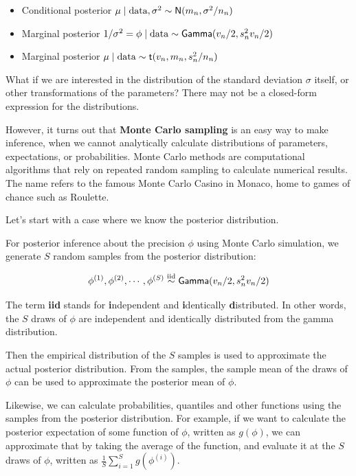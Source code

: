 \documentclass[]{book}
\providecommand{\tightlist}{%
  \setlength{\itemsep}{0pt}\setlength{\parskip}{0pt}}
\theoremstyle{definition}
\theoremstyle{definition}
\theoremstyle{definition}
\theoremstyle{remark}
\begin{document}
\begin{itemize}
\tightlist
\item
  Conditional posterior
  \(\mu \mid \text{data}, \sigma^2 \sim \textsf{N}(m_n, \sigma^2/n_n)\)
\item
  Marginal posterior
  \(1/\sigma^2 = \phi \mid \text{data} \sim \textsf{Gamma}(v_n/2,s^2_n v_n/2)\)
\item
  Marginal posterior \(\mu \mid \text{data} \sim \textsf{t}(v_n, m_n, s^2_n/n_n)\)
\end{itemize}

What if we are interested in the distribution of the standard deviation
\(\sigma\) itself, or other transformations of the parameters? There may
not be a closed-form expression for the distributions.

However, it turns out that \textbf{Monte Carlo sampling} is an easy way
to make inference, when we cannot analytically calculate distributions
of parameters, expectations, or probabilities. Monte Carlo methods are
computational algorithms that rely on repeated random sampling to
calculate numerical results. The name refers to the famous Monte Carlo
Casino in Monaco, home to games of chance such as Roulette.

Let's start with a case where we know the posterior distribution.

For posterior inference about the precision \(\phi\) using Monte Carlo
simulation, we generate \(S\) random samples from the posterior
distribution:

\[\phi^{(1)},\phi^{(2)},\cdots,\phi^{(S)} \mathrel{\mathop{\sim}\limits^{\rm iid}} \textsf{Gamma}(v_n/2,s^2_n v_n/2)\]

The term \textbf{iid} stands for \textbf{i}ndependent and
\textbf{i}dentically \textbf{d}istributed. In other words, the \(S\)
draws of \(\phi\) are independent and identically distributed from the
gamma distribution.

Then the empirical distribution of the \(S\) samples is used to
approximate the actual posterior distribution. From the samples, the
sample mean of the draws of \(\phi\) can be used to approximate the
posterior mean of \(\phi\).

Likewise, we can calculate probabilities, quantiles and other functions
using the samples from the posterior distribution. For example, if we
want to calculate the posterior expectation of some function of
\(\phi\), written as \(g(\phi)\), we can approximate that by taking the
average of the function, and evaluate it at the \(S\) draws of \(\phi\),
written as \(\frac{1}{S}\sum^S_{i=1}g(\phi^{(i)})\).
\end{document}
